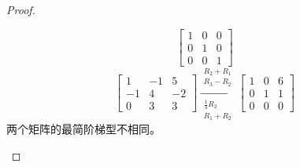 \begin{proof}
\begin{enumerate}
\begin{equation*}
                  \begin{bmatrix}
                      1 & 0 & 0 \\
                      0 & 1 & 0 \\
                      0 & 0 & 1
                  \end{bmatrix}
              \end{equation*}
              \begin{equation*}
                  \begin{bmatrix}1&-1&5\\-1&4&-2\\0&3&3\end{bmatrix}\xrightarrow[\substack{\frac{1}{3}R_2\\R_1+R_2}]{\substack{R_2+R_1\\R_3-R_2}}
                  \begin{bmatrix}
                      1 & 0 & 6 \\
                      0 & 1 & 1 \\
                      0 & 0 & 0
                  \end{bmatrix}
              \end{equation*}
              两个矩阵的最简阶梯型不相同。
    \end{enumerate}
\end{proof}

